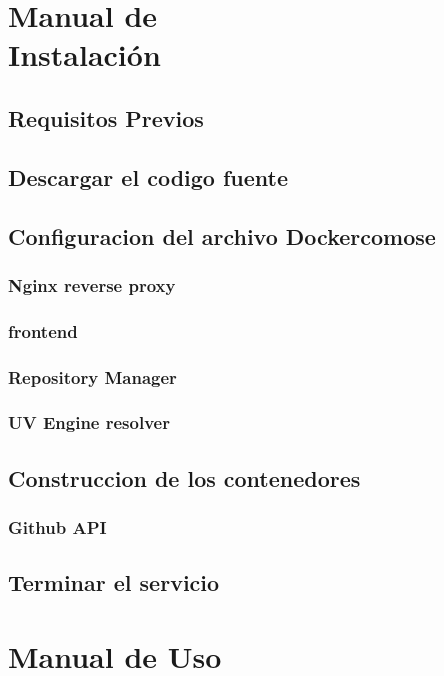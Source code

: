 \documentclass[12pt, a4paper, twoside]{article}
\begin{document}
\begin{umaappendices}
    \section{Manual de \\ Instalación}
	\label{sec:Manual de Instalación}
	\subsection{Requisitos Previos}
	\subsection{Descargar el codigo fuente}
	\subsection{Configuracion del archivo Dockercomose}
	\subsubsection{Nginx reverse proxy}
	\subsubsection{frontend}
	\subsubsection{Repository Manager}
	\subsubsection{UV Engine resolver}
	\subsection{Construccion de los contenedores}
	\subsubsection{Github API}
	\subsection{Terminar el servicio}



    \section{Manual de Uso}
	\label{sec:Manual de Uso}

\end{umaappendices}
\end{document}
